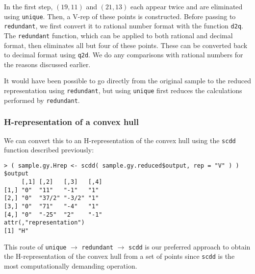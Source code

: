 In the first step, $(19,11)$ and $(21,13)$ each appear twice and are eliminated
using \texttt{unique}.  Then, a V-rep of these points is constructed.  Before
passing to \texttt{redundant}, we first convert it to rational number format
with the function \texttt{d2q}.  The \texttt{redundant} function, which can
be applied to both rational and decimal format, then eliminates
all but four of these points.  These can be converted back to decimal format
using \texttt{q2d}.  We do any comparisons
with rational numbers for the reasons discussed earlier.

It would have been possible to go directly from the original sample to the reduced 
representation using \texttt{redundant}, but using \texttt{unique} first reduces 
the calculations performed by \texttt{redundant}.

\subsubsection{H-representation of a convex hull}
We can convert this to an H-representation of the convex hull 
using the \texttt{scdd} function described previously:
{\singlespace \begin{verbatim}
> ( sample.gy.Hrep <- scdd( sample.gy.reduced$output, rep = "V" ) )
$output
     [,1] [,2]   [,3]   [,4]
[1,] "0"  "11"   "-1"   "1" 
[2,] "0"  "37/2" "-3/2" "1" 
[3,] "0"  "71"   "-4"   "1" 
[4,] "0"  "-25"  "2"    "-1"
attr(,"representation")
[1] "H"
\end{verbatim}
}

This route of \texttt{unique} $\rightarrow$ \texttt{redundant} $\rightarrow$ 
\texttt{scdd} is our preferred approach to obtain the H-representation of the convex hull from a set of points since \texttt{scdd} is the most computationally demanding
operation.

